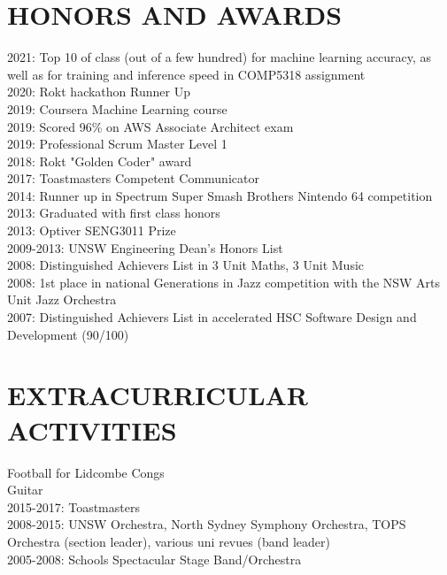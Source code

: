 \documentclass{res}
\begin{document}
\begin{resume}
 
\section{HONORS AND AWARDS}          
    2021: Top 10 of class (out of a few hundred) for machine learning accuracy, as well as for training and inference speed in COMP5318 assignment \\
    2020: Rokt hackathon Runner Up \\
    2019: Coursera Machine Learning course \\
    2019: Scored 96\% on AWS Associate Architect exam \\
    2019: Professional Scrum Master Level 1 \\
    2018: Rokt "Golden Coder" award \\
    2017: Toastmasters Competent Communicator \\
    2014: Runner up in Spectrum Super Smash Brothers Nintendo 64 competition \\
    2013: Graduated with first class honors \\
    2013: Optiver SENG3011 Prize \\
    2009-2013: UNSW Engineering Dean's Honors List \\
    2008: Distinguished Achievers List in 3 Unit Maths, 3 Unit Music \\
    2008: 1st place in national Generations in Jazz competition with the NSW Arts Unit Jazz Orchestra \\
    2007: Distinguished Achievers List in accelerated HSC Software Design and Development (90/100)
 
\section{EXTRACURRICULAR ACTIVITIES}          
    Football for Lidcombe Congs \\
    Guitar \\
    2015-2017: Toastmasters \\
    2008-2015: UNSW Orchestra, North Sydney Symphony Orchestra, TOPS Orchestra (section leader), various uni revues (band leader) \\
    2005-2008: Schools Spectacular Stage Band/Orchestra
 
\end{resume}
\end{document}
